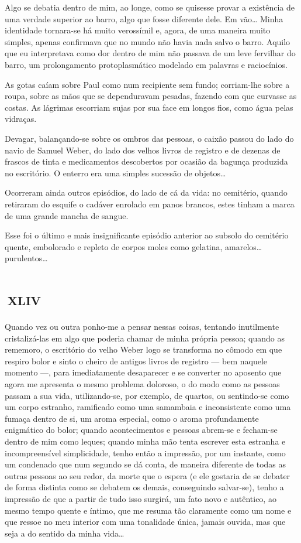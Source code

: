 Algo se debatia dentro de mim, ao longe, como se quisesse provar a existência de uma verdade superior ao barro, algo que fosse diferente dele. Em vão\ldots{} Minha identidade tornara-se há muito verossímil e, agora, de uma maneira muito simples, apenas confirmava que no mundo não havia nada salvo o barro. Aquilo que eu interpretava como dor dentro de mim não passava de um leve fervilhar do barro, um prolongamento protoplasmático modelado em palavras e raciocínios.

As gotas caíam sobre Paul como num recipiente sem fundo; corriam-lhe sobre a roupa, sobre as mãos que se dependuravam pesadas, fazendo com que curvasse as costas. As lágrimas escorriam sujas por sua face em longos fios, como água pelas vidraças.

Devagar, balançando-se sobre os ombros das pessoas, o caixão passou do lado do navio de Samuel Weber, do lado dos velhos livros de registro e de dezenas de frascos de tinta e medicamentos descobertos por ocasião da bagunça produzida no escritório. O enterro era uma simples sucessão de objetos\ldots{}

Ocorreram ainda outros episódios, do lado de cá da vida: no cemitério, quando retiraram do esquife o cadáver enrolado em panos brancos,  estes tinham a marca de uma grande mancha de sangue.

Esse foi o último e mais insignificante episódio anterior ao subsolo do cemitério quente, embolorado e repleto de corpos moles como gelatina, amarelos\ldots{} purulentos\ldots{}


\chapter*{\small{}\,\Large\centering\textsc{xliv}\,\small{}}

Quando vez ou outra ponho-me a pensar nessas coisas, tentando inutilmente cristalizá-las em algo que poderia chamar de minha própria pessoa; quando as rememoro, o escritório do velho Weber logo se transforma no cômodo em que respiro bolor e sinto o cheiro de antigos livros de registro --- bem naquele momento ---, para imediatamente desaparecer e se converter no aposento que agora me apresenta o mesmo problema doloroso, o do modo como as pessoas passam a sua vida, utilizando-se, por exemplo, de quartos, ou sentindo-se como um corpo estranho, ramificado como uma samambaia e inconsistente como uma fumaça dentro de si, um aroma especial, como o aroma profundamente enigmático do bolor; quando acontecimentos e pessoas abrem-se e fecham-se dentro de mim como leques; quando minha mão tenta escrever esta estranha e incompreensível simplicidade, tenho então a impressão, por um instante, como um condenado que num segundo se dá conta, de maneira diferente de todas as outras pessoas ao seu redor, da morte que o espera (e ele gostaria de se debater de forma distinta como se debatem os demais, conseguindo salvar-se), tenho a impressão de que a partir de tudo isso surgirá, um fato novo e autêntico, ao mesmo tempo quente e íntimo, que me resuma tão claramente como um nome e que ressoe no meu interior com uma tonalidade única, jamais ouvida, mas que seja a do sentido da minha vida\ldots{}


